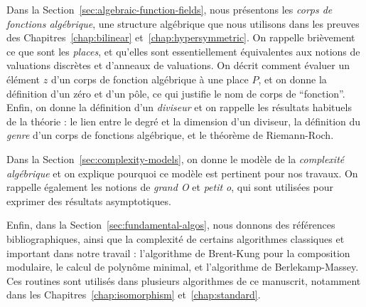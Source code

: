 Dans la Section~\ref{sec:algebraic-function-fields}, nous présentons les
\emph{corps de
fonctions algébrique}, une structure algébrique que nous utilisons dans les
preuves des Chapitres~\ref{chap:bilinear} et~\ref{chap:hypersymmetric}. On
rappelle brièvement ce que sont les \emph{places}, et qu'elles sont
essentiellement équivalentes aux notions de valuations discrètes et d'anneaux de
valuations. On décrit comment évaluer un élément $z$ d'un corps de fonction
algébrique à une place $P$, et on donne la définition d'un zéro et d'un pôle, ce
qui justifie le nom de corps de ``fonction''. Enfin, on donne la définition d'un
\emph{diviseur} et on rappelle les résultats habituels de la théorie : le lien
entre le degré et la dimension d'un diviseur, la définition du \emph{genre} d'un
corps de fonctions algébrique, et le théorème de Riemann-Roch.

Dans la Section~\ref{sec:complexity-models}, on donne le modèle de la
\emph{complexité algébrique} et on explique pourquoi ce modèle est pertinent
pour nos travaux. On rappelle également les notions de \emph{grand O} et
\emph{petit o}, qui sont utilisées pour exprimer des résultats asymptotiques.

Enfin, dans la Section~\ref{sec:fundamental-algos}, nous donnons des références
bibliographiques, ainsi que la complexité de certains algorithmes classiques et
important dans notre travail : l'algorithme de Brent-Kung pour la composition
modulaire, le calcul de polynôme minimal, et l'algorithme de Berlekamp-Massey.
Ces routines sont utilisés dans plusieurs algorithmes de ce manuscrit, notamment
dans les Chapitres~\ref{chap:isomorphism} et~\ref{chap:standard}.

